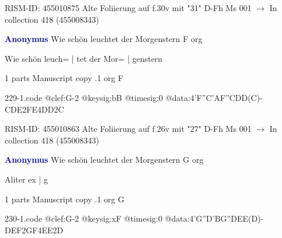 \documentclass[twocolumn]{book}
\begin{document}
\newline RISM-ID: 455010875
\newline Alte Foliierung auf f.30v mit "31"
\newline D-Fh  Ms 001
\newline $\rightarrow$ In collection 418 (455008343)

\newline \par \vspace{7pt} \textcolor{darkblue}{\textbf{Anonymus  }}
\newline Wie schön leuchtet der Morgenstern  F  
\newline org
\newline \begin{itshape}[f.26v, at left:] Wie schön leuch= | tet der Mor= | genstern\end{itshape} 
\newline \textcolor{darkblue}{}  1 parts  
\newline Manuscript copy
.1  org  F  
\begin{filecontents*}{229-1.code}
@clef:G-2
@keysig:bB
@timesig:0
@data:4'F''C'AF''CDD(C)-CDE2FE4DD2C
\end{filecontents*}
\newline
%

\newline RISM-ID: 455010863
\newline Alte Foliierung auf f.26v mit "27"
\newline D-Fh  Ms 001
\newline $\rightarrow$ In collection 418 (455008343)

\newline \par \vspace{7pt} \textcolor{darkblue}{\textbf{Anonymus  }}
\newline Wie schön leuchtet der Morgenstern  G  
\newline org
\newline \begin{itshape}[f.26v, at left:] Aliter ex | g\end{itshape} 
\newline \textcolor{darkblue}{}  1 parts  
\newline Manuscript copy
.1  org  G  
\begin{filecontents*}{230-1.code}
@clef:G-2
@keysig:xF
@timesig:0
@data:4'G''D'BG''DEE(D)-DEF2GF4EE2D
\end{filecontents*}
\newline
%
\end{document}
